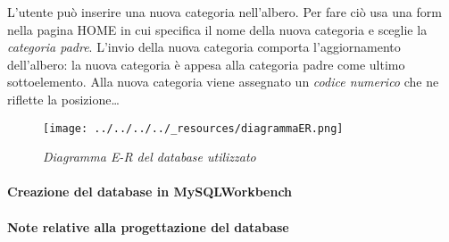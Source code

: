 L'utente può inserire una nuova categoria nell'albero. Per fare ciò usa
una form nella pagina HOME in cui specifica il nome della nuova
categoria e sceglie la \emph{categoria padre}. L'invio della nuova
categoria comporta l'aggiornamento dell'albero: la nuova categoria è
appesa alla categoria padre come ultimo sottoelemento. Alla nuova
categoria viene assegnato un \emph{codice numerico} che ne riflette la
posizione\ldots{}

\begin{figure}
\centering
\texttt{[image: ../../../../\_resources/diagrammaER.png]}
\caption{\emph{Diagramma E-R del database utilizzato}}
\end{figure}

\pagebreak

\hypertarget{creazione-del-database-in-mysqlworkbench}{%
\paragraph{Creazione del database in
MySQLWorkbench}\label{creazione-del-database-in-mysqlworkbench}}

\begin{Shaded}
\begin{Highlighting}[]
  \NormalTok{ (}
 \NormalTok{,}
\NormalTok{(}\NormalTok{) } \NormalTok{,}
 \NormalTok{,}
   
    
       
\NormalTok{)}

  \NormalTok{ (}
\NormalTok{(}\NormalTok{) } \NormalTok{,}
   \NormalTok{(}\NormalTok{) } \NormalTok{,}
   
\NormalTok{) }
\end{Highlighting}
\end{Shaded}

\hypertarget{note-relative-alla-progettazione-del-database}{%
\paragraph{Note relative alla progettazione del
database}\label{note-relative-alla-progettazione-del-database}}

